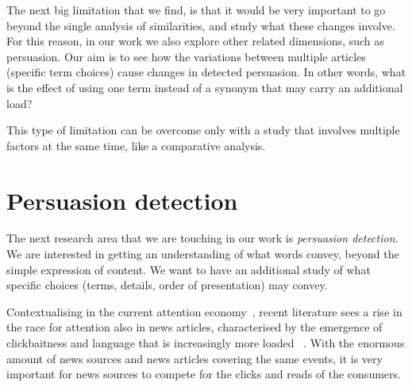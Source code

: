 The next big limitation that we find, is that it would be very important to go beyond the single analysis of similarities, and study what these changes involve.
For this reason, in our work we also explore other related dimensions, such as persuasion.
Our aim is to see how the variations between multiple articles (specific term choices) cause changes in detected persuasion. In other words, what is the effect of using one term instead of a synonym that may carry an additional load?


This type of limitation can be overcome only with a study that involves multiple factors at the same time, like a comparative analysis.

\section{\statusorange Persuasion detection}
\label{sec:lit_persuasion}

The next research area that we are touching in our work is \emph{persuasion detection}.
We are interested in getting an understanding of what words convey, beyond the simple expression of content.
We want to have an additional study of what specific choices (terms, details, order of presentation) may convey.



Contextualising in the current attention economy~\citep{davenport2001attention}, recent literature sees a rise in the race for attention also in news articles, characterised by the emergence of clickbaitness and language that is increasingly more loaded ~\citep{bazaco2019clickbait,davenport2001attention}.
With the enormous amount of news sources and news articles covering the same events, it is very important for news sources to compete for the clicks and reads of the consumers.

